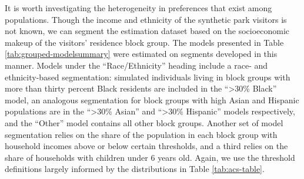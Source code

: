\documentclass[3p, authoryear, review]{elsarticle} %
\begin{document}
It is worth investigating the heterogeneity in preferences that exist among
populations. Though the income and ethnicity of the synthetic park visitors is
not known, we can segment the estimation dataset based on the socioeconomic
makeup of the visitors' residence block group. The models presented in Table
\ref{tab:grouped-modelsummary} were estimated on segments developed in this
manner. Models under the ``Race/Ethnicity'' heading include a race- and
ethnicity-based segmentation: simulated individuals living in block groups with
more than thirty percent Black residents are included in the ``\textgreater30\% Black'' model,
an analogous segmentation for block groups with high Asian and Hispanic
populations are in the ``\textgreater30\% Asian'' and ``\textgreater30\% Hispanic'' models respectively, and
the ``Other'' model contains all other block groups. Another set of model
segmentation relies on the share of the population in each block group with
household incomes above or below certain thresholds, and a third relies on the
share of households with children under 6 years old. Again, we use the threshold
definitions largely informed by the distributions in Table \ref{tab:acs-table}.
\end{document}
